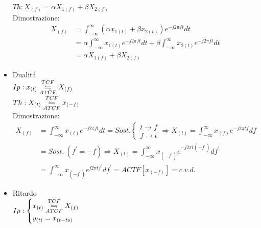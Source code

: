 \begin{itemize}
{                    $Th: X_{(f)} = \alpha X_{1(f)} + \beta X_{2(f)}$\\ 
                    Dimostrazione:
                    \begin{align}
                        X_{(f)} & = \int_{-\infty}^{\infty} (\alpha x_{1(t)} + \beta x_{2(t)}) e^{-j2\pi ft} dt \nonumber \\
                                & = \alpha \int_{-\infty}^{\infty} x_{1(t)} e^{-j2\pi ft} dt + \beta \int_{-\infty}^{\infty}  x_{2(t)} e^{-j2\pi ft} dt  \nonumber \\
                                & = \alpha X_{1(f)} + \beta X_{2(f)} \nonumber
                    \end{align}
    
                }
                \item{Dualitá\\
                    $Ip: x_{(t)} \overunderset{TCF}{ATCF}{\leftrightharpoons} X_{(f)}$\\        
                    $Th: X_{(t)} \overunderset{TCF}{ATCF}{\leftrightharpoons} x_{(-f)}$ \\
                    Dimostrazione:
                    \begin{align}
                        X_{(f)} & = \int_{-\infty}^{\infty} x_{(t)} e^{-j2\pi ft} dt = Sost. \begin{cases}
                            t \rightarrow f\\
                            f \rightarrow t
                        \end{cases} \Rightarrow  X_{(t)} = \int_{-\infty}^{\infty} x_{(f)} e^{-j2\pi tf} df \nonumber \\
                                & =Sost.\ (f^\prime = -f) \Rightarrow  X_{(t)} = \int_{-\infty}^{\infty} x_{(-f^\prime)} e^{-j2\pi t(-f^\prime)} df^\prime\nonumber \\
                                & =\int_{-\infty}^{\infty} x_{(-f^\prime)} e^{j2\pi tf^\prime} df^\prime= ACTF[x_{(-f)}] = c.v.d.  \nonumber
                    \end{align}
                }
                \item{Ritardo\\
                    $Ip: \begin{cases}
                        x_{(t)} \overunderset{TCF}{ATCF}{\leftrightharpoons} X_{(f)} \nonumber \\
                        y_{(t)} = x_{(t-to)} \nonumber
                    \end{cases}$\\
}
\end{itemize}
